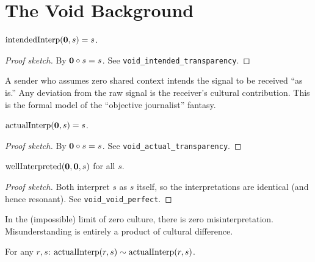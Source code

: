 \section{The Void Background}
\label{sec:ch5:void-bg}

\begin{theorem}
\label{thm:void-intended}
$\operatorname{intendedInterp}(\mathbf{0}, s) = s$.
\end{theorem}

\begin{proof}[Proof sketch]
By $\mathbf{0} \circ s = s$.  See \texttt{void\_intended\_transparency}.
\end{proof}

\begin{remark}
A sender who assumes zero shared context intends the signal to be
received ``as is.''  Any deviation from the raw signal is the receiver's
cultural contribution.  This is the formal model of the ``objective
journalist'' fantasy.
\end{remark}

\begin{theorem}
\label{thm:void-actual}
$\operatorname{actualInterp}(\mathbf{0}, s) = s$.
\end{theorem}

\begin{proof}[Proof sketch]
By $\mathbf{0} \circ s = s$.  See \texttt{void\_actual\_transparency}.
\end{proof}

\begin{theorem}
\label{thm:void-void-perfect}
$\operatorname{wellInterpreted}(\mathbf{0}, \mathbf{0}, s)$ for all $s$.
\end{theorem}

\begin{proof}[Proof sketch]
Both interpret $s$ as $s$ itself, so the interpretations are identical
(and hence resonant).
See \texttt{void\_void\_perfect}.
\end{proof}

\begin{remark}
In the (impossible) limit of zero culture, there is zero
misinterpretation.  Misunderstanding is entirely a product of cultural
difference.
\end{remark}

\begin{theorem}
\label{thm:hermeneutic-circle}
For any $r, s$:
$\operatorname{actualInterp}(r, s) \sim \operatorname{actualInterp}(r, s)$.
\end{theorem}

